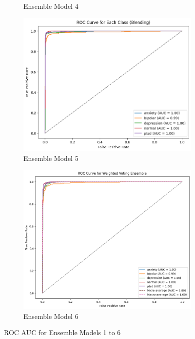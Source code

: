 \begin{figure}[H]
\begin{subfigure}[b]{0.48\textwidth}
        \caption{Ensemble Model 4}
        \label{bag roc}  %
    \end{subfigure}
    \hfill
    \begin{subfigure}[b]{0.48\textwidth}
        \centering
        \includegraphics[width=\textwidth]{Images/BLD ROC.png}
        \caption{Ensemble Model 5}
        \label{bld roc}  %
    \end{subfigure}
    \hfill
    \begin{subfigure}[b]{0.48\textwidth}
        \centering
        \includegraphics[width=\textwidth]{Images/WV ROC.png}
        \caption{Ensemble Model 6}
        \label{wv roc}  %
    \end{subfigure}
    \label{fig:ensemble_model_comparison}
    \caption{ROC AUC for Ensemble Models 1 to 6}
\end{figure}

